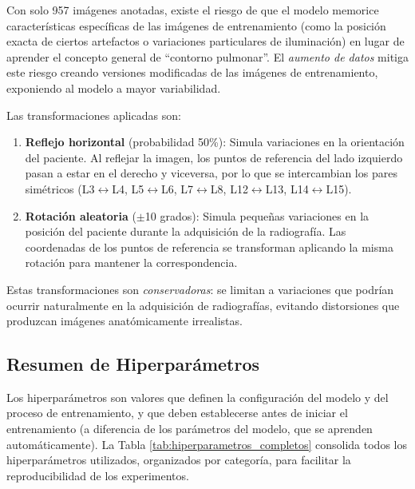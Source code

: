 Con solo 957 imágenes anotadas, existe el riesgo de que el modelo memorice características específicas de las imágenes de entrenamiento (como la posición exacta de ciertos artefactos o variaciones particulares de iluminación) en lugar de aprender el concepto general de ``contorno pulmonar''. El \textit{aumento de datos} mitiga este riesgo creando versiones modificadas de las imágenes de entrenamiento, exponiendo al modelo a mayor variabilidad.

Las transformaciones aplicadas son:

\begin{enumerate}
    \item \textbf{Reflejo horizontal} (probabilidad 50\%): Simula variaciones en la orientación del paciente. Al reflejar la imagen, los puntos de referencia del lado izquierdo pasan a estar en el derecho y viceversa, por lo que se intercambian los pares simétricos (L3$\leftrightarrow$L4, L5$\leftrightarrow$L6, L7$\leftrightarrow$L8, L12$\leftrightarrow$L13, L14$\leftrightarrow$L15).

    \item \textbf{Rotación aleatoria} ($\pm$10 grados): Simula pequeñas variaciones en la posición del paciente durante la adquisición de la radiografía. Las coordenadas de los puntos de referencia se transforman aplicando la misma rotación para mantener la correspondencia.
\end{enumerate}

Estas transformaciones son \textit{conservadoras}: se limitan a variaciones que podrían ocurrir naturalmente en la adquisición de radiografías, evitando distorsiones que produzcan imágenes anatómicamente irrealistas.

\subsection{Resumen de Hiperparámetros}
\label{subsec:resumen_hiperparametros}

Los hiperparámetros son valores que definen la configuración del modelo y del proceso de entrenamiento, y que deben establecerse antes de iniciar el entrenamiento (a diferencia de los parámetros del modelo, que se aprenden automáticamente). La Tabla \ref{tab:hiperparametros_completos} consolida todos los hiperparámetros utilizados, organizados por categoría, para facilitar la reproducibilidad de los experimentos.

